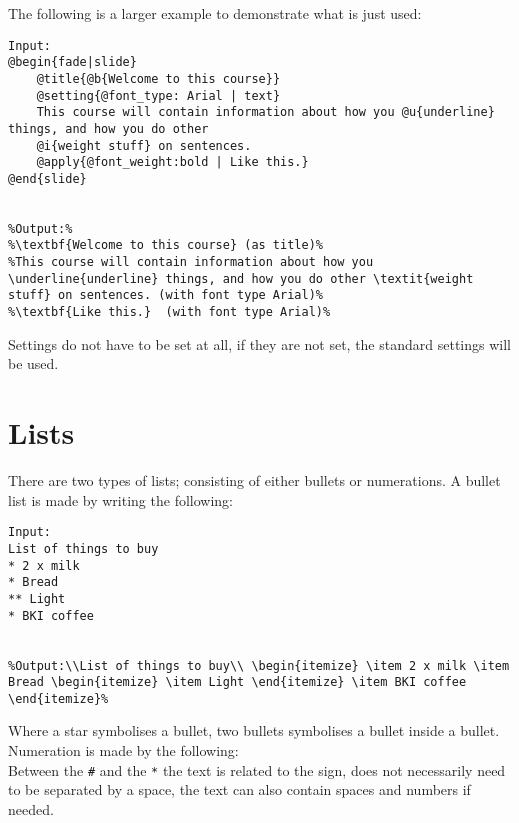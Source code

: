 The following is a larger example to demonstrate what is just used: \\

\begin{lstlisting}[frame=single]
Input:
@begin{fade|slide}
    @title{@b{Welcome to this course}}
    @setting{@font_type: Arial | text}
    This course will contain information about how you @u{underline} things, and how you do other    
    @i{weight stuff} on sentences.
    @apply{@font_weight:bold | Like this.}
@end{slide}


%Output:%
%\textbf{Welcome to this course} (as title)%
%This course will contain information about how you \underline{underline} things, and how you do other \textit{weight stuff} on sentences. (with font type Arial)%
%\textbf{Like this.}  (with font type Arial)%
\end{lstlisting}

Settings do not have to be set at all, if they are not set, the standard settings will be used.

\section{Lists}
There are two types of lists; consisting of either bullets or numerations.
A bullet list is made by writing the following: \\

\begin{lstlisting}[frame=single]
Input:
List of things to buy
* 2 x milk
* Bread
** Light
* BKI coffee

 
%Output:\\List of things to buy\\ \begin{itemize} \item 2 x milk \item Bread \begin{itemize} \item Light \end{itemize} \item BKI coffee \end{itemize}%
\end{lstlisting}

Where a star symbolises a bullet, two bullets symbolises a bullet inside a bullet.
Numeration is made by the following: \\
Between the \texttt{\#} and the \texttt{*} the text is related to the sign, does not necessarily need to be separated by a space, the text can also contain spaces and numbers if needed.\\

